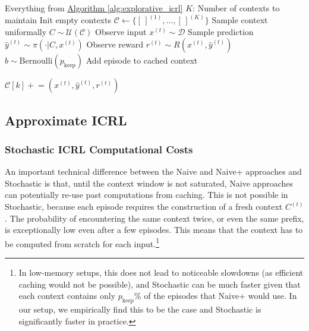 \documentclass{article}
\theoremstyle{plain}
\theoremstyle{definition}
\theoremstyle{remark}
\newcommand{\autorefalg}[1]{\hyperref[#1]{Algorithm \ref*{#1}}}
\newcommand{\context}{C}
\newcommand{\example}{x}
\newcommand{\prediction}{y}
\newcommand{\datadist}{\mathcal{D}}
\newcommand{\rewardfunc}{R}
\newcommand{\reward}{r}
\newcommand{\keepprob}{p_\text{keep}}
\newcommand{\policy}{\pi}
\newcommand{\contextstore}{\mathcal{C}}
\newcommand{\uniform}{\mathcal{U}}
\newcommand{\storagesize}{K}
\newcommand{\explorative}{Stochastic ICRL\xspace}
\newcommand{\approximate}{Approximate ICRL\xspace}
\newcommand{\naiveshort}{Naive\xspace}
\newcommand{\naiveplusshort}{Naive+\xspace}
\newcommand{\expshort}{Stochastic\xspace}
\begin{document}
\begin{algorithm}[!t]
    \footnotesize
    \caption{\approximate}\label{alg:approximate_icrl}
    \begin{algorithmic}[1]
        \REQUIRE
        \STATEX Everything from \autorefalg{alg:explorative_icrl}
        \STATEX $\storagesize$: Number of contexts to maintain
        \STATEX
        \STATE Init empty contexts $\mathcal{C} \gets \{[\,]^{(1)},\dots,[\,]^{(\storagesize)}\}$ \label{ln:aicrl:init_contexts}
            \STATE Sample context uniformally $\context \sim \uniform \left( \mathcal{C} \right)$ \label{ln:aicrl:sample_context}
            \STATE Observe input $\example^{(t)} \sim \datadist$ \label{ln:aicrl:input}
            \STATE Sample prediction $\hat{\prediction}^{(t)} \sim \policy( \cdot \vert \context, \example^{(t)})$
            \STATE Observe reward $\reward^{(t)} \sim \rewardfunc(\example^{(t)}, \hat{\prediction}^{(t)})$  \label{ln:aicrl:reward}
             \label{ln:aicrl:testreward}
                \FOR{$k = 1$ to $\storagesize$}\label{ln:aicrl:itercontexts}
                    \STATE $b \sim \text{Bernoulli}(\keepprob)$
                        \STATE Add episode to cached context \par \hspace{4em} $\contextstore[k] \mathrel{+}= (\example^{(t)}, \hat{\prediction}^{(t)}, \reward^{(t)})$ \label{ln:aicrl:updatecontext}
                    \ENDIF
                \ENDFOR
            \ENDIF
        \ENDFOR
    \end{algorithmic}
\end{algorithm}
\subsection{\approximate}\label{sec:icrl:approximate}
\subsubsection{\explorative Computational Costs}
An important technical difference between the \naiveshort and \naiveplusshort approaches and \expshort is that, until the context window is not saturated, \naiveshort approaches can potentially re-use past computations from caching. This is not possible in \expshort, because each episode requires the construction of a fresh context $\context^{(t)}$. The probability of encountering the same context twice, or even the same prefix, is exceptionally low even after a few episodes.
This means that the context has to be computed from scratch for each input.\footnote{In low-memory setups, this does not lead to noticeable slowdowns (as efficient caching would not be possible), and \expshort can be much faster given that each context contains only $\keepprob$\% of the episodes that \naiveplusshort would use. In our setup, we empirically find this to be the case and \expshort is significantly faster in practice.}
\end{document}
